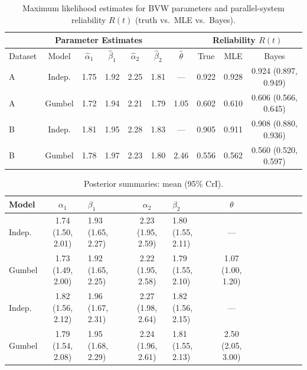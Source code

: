 \documentclass[twoside]{article}
\theoremstyle{plain}
\theoremstyle{definition}
\begin{document}
\begin{table}[h!]
\centering
\caption{Maximum likelihood estimates for BVW parameters and parallel-system reliability $R(t)$ (truth vs.\ MLE vs.\ Bayes).}
\begin{tabular}{@{}lcccccc|ccc@{}}
\toprule
\multicolumn{7}{c|}{\textbf{Parameter Estimates}} & \multicolumn{3}{c}{\textbf{Reliability $R(t)$}} \\ \hline
\midrule
Dataset & Model & $\hat\alpha_1$ & $\hat\beta_1$ & $\hat\alpha_2$ & $\hat\beta_2$ & $\hat\theta$ 
& True & MLE & Bayes \\ \hline
\midrule
A & Indep. & 1.75 & 1.92 & 2.25 & 1.81 & --- & 0.922 & 0.928 & 0.924 (0.897, 0.949) \\ \hline
A & Gumbel & 1.72 & 1.94 & 2.21 & 1.79 & 1.05 & 0.602 & 0.610 & 0.606 (0.566, 0.645) \\ \hline
B & Indep. & 1.81 & 1.95 & 2.28 & 1.83 & --- & 0.905 & 0.911 & 0.908 (0.880, 0.936) \\ \hline
B & Gumbel & 1.78 & 1.97 & 2.23 & 1.80 & 2.46 & 0.556 & 0.562 & 0.560 (0.520, 0.597) \\ 
\bottomrule
\end{tabular}
\label{tab:combined}
\end{table}

\begin{table}[h!]
\centering
\caption{Posterior summaries: mean (95\% CrI). }
\begin{tabular}{@{}lclclclclclc@{}}
\toprule
 Model & $\alpha_1$ & $\beta_1$ & $\alpha_2$ & $\beta_2$ & $\theta$ \\ 
\hline
 Indep. & 1.74 (1.50, 2.01) & 1.93 (1.65, 2.27) & 2.23 (1.95, 2.59) & 1.80 (1.55, 2.11) & --- \\
 \hline
 Gumbel & 1.73 (1.49, 2.00) & 1.92 (1.65, 2.25) & 2.22 (1.95, 2.58) & 1.79 (1.55, 2.10) & 1.07 (1.00, 1.20) \\
 \hline
 Indep. & 1.82 (1.56, 2.12) & 1.96 (1.67, 2.31) & 2.27 (1.98, 2.64) & 1.82 (1.56, 2.15) & --- \\
 \hline
 Gumbel & 1.79 (1.54, 2.08) & 1.95 (1.68, 2.29) & 2.24 (1.96, 2.61) & 1.81 (1.55, 2.13) & 2.50 (2.05, 3.00) \\
\bottomrule
\end{tabular}
\label{tab:bayes}
\end{table}
\end{document}
